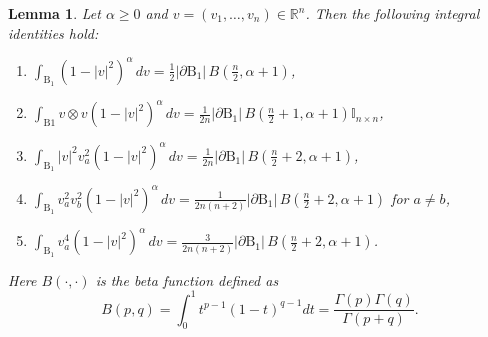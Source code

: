 \documentclass[10pt,reqno]{amsart}
\numberwithin{equation}{section}
\newtheorem{lemma}{Lemma}[section]
\newcommand{\R}{\mathbb R}
\begin{document}
\begin{lemma}\label{lem_vm0}
Let $\alpha \geq 0$ and $v = (v_1, \dots, v_n) \in \R^n$. Then the following integral identities hold:
\begin{enumerate}[label=(\roman*)]
\item $\displaystyle \int_{\mathrm{B}_1} (1 - |v|^2)^\alpha \, dv = \frac{1}{2} |\partial \mathrm{B}_1| \, B\left(\frac{n}{2}, \alpha + 1\right)$,
\item $\displaystyle \int_{\mathrm{B}1} v \otimes v (1 - |v|^2)^\alpha\, dv = \frac{1}{2n} |\partial \mathrm{B}_1|\, B\left(\frac{n}{2}+1, \alpha + 1\right) \mathbb{I}_{n \times n}$,
\item $\displaystyle \int_{\mathrm{B}_1} |v|^2 v_a^2 (1 - |v|^2)^\alpha \, dv = \frac{1}{2n} |\partial \mathrm{B}_1| \, B\left(\frac{n}{2}+2, \alpha + 1\right)$,
\item $\displaystyle \int_{\mathrm{B}_1} v_a^2 v_b^2 (1 - |v|^2)^\alpha \, dv = \frac{1}{2n(n+2)} |\partial \mathrm{B}_1| \, B\left(\frac{n}{2}+2, \alpha + 1\right)$ for $a \neq b$,
\item $\displaystyle \int_{\mathrm{B}_1} v_a^4 (1 - |v|^2)^\alpha \, dv = \frac{3}{2n(n+2)} |\partial \mathrm{B}_1| \, B\left(\frac{n}{2}+2, \alpha + 1\right)$.
\end{enumerate}
Here $B(\cdot, \cdot)$ is the beta function defined as
$$
B(p,q) = \int_0^1 t^{p-1}(1 - t)^{q-1} dt = \frac{\Gamma(p)\Gamma(q)}{\Gamma(p+q)}.
$$
\end{lemma}
\end{document}
